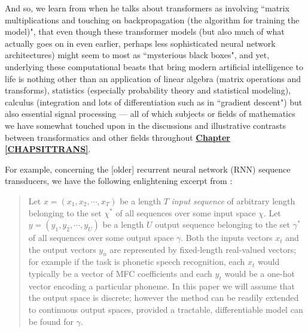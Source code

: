 \documentclass[a4paper, 18pt]{book} %
\begin{document}
\begin{appendices}
\vspace{2em}

And so, we learn from \cite{Rohrer2020} when he talks about transformers as involving ``matrix multiplications and touching on backpropagation (the algorithm for training the model)", that even though these transformer models (but also much of what actually goes on in even earlier, perhaps less sophisticated neural network architectures\cite{Vaswani2017}) might seem to most as ``mysterious black boxes", and yet, underlying these computational beasts that bring modern artificial intelligence to life is nothing other than an application of linear algebra (matrix operations and transforms), statistics (especially probability theory and statistical modeling), calculus (integration and lots of differentiation such as in ``gradient descent"\cite{Graves2012}) but also essential signal processing --- all of which subjects or fields of mathematics we have somewhat touched upon in the discussions and illustrative contrasts between transformatics and other fields throughout \textbf{\hyperref[CHAPSITTRANS]{Chapter \ref{CHAPSITTRANS}}}.


\vspace{2em}

For example, concerning the [older] recurrent neural network (RNN) sequence transducers, we have the following enlightening excerpt from \cite{Graves2012}:\\


\noindent
\begin{minipage}{1\textwidth}
\vspace{1em}
\begin{quotation}
{\ttfamily

Let $x = (x_1, x_2, \cdots , x_T )$ be a length $T$ \textit{input sequence} of arbitrary length belonging to the set $\chi^*$ of all sequences over some input space $\chi$. Let $y =
(y_1, y_2, \cdots , y_U )$ be a length $U$ output sequence belonging to the set $\gamma^*$ of all sequences over some output space $\gamma$. Both the inputs vectors $x_t$ and the output
vectors $y_u$ are represented by fixed-length real-valued vectors; for example if the task is phonetic speech recognition, each $x_t$ would typically be a vector of MFC coefficients and each $y_t$ would be a one-hot vector encoding a particular phoneme. In this paper we will assume that the output space is discrete; however the method can be readily extended to continuous output spaces, provided a tractable, differentiable model can be found for $\gamma$.\\

}
\end{quotation}
\end{minipage}
\end{appendices}
\end{document}
